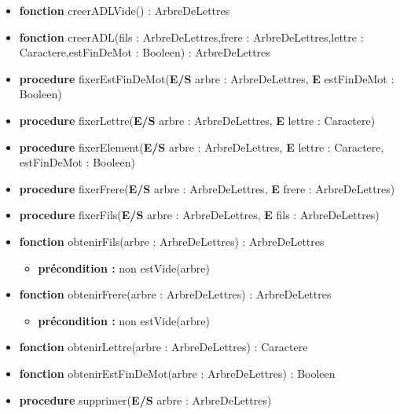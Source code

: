 \begin{itemize}[label=$\ $, leftmargin=1cm]
     \item \textbf{fonction} creerADLVide() : ArbreDeLettres
     \item \textbf{fonction} creerADL(fils : ArbreDeLettres,frere : ArbreDeLettres,lettre : Caractere,estFinDeMot : Booleen) : ArbreDeLettres
     \item \textbf{procedure} fixerEstFinDeMot(\textbf{E/S} arbre : ArbreDeLettres, \textbf{E} estFinDeMot : Booleen)
     \item \textbf{procedure} fixerLettre(\textbf{E/S} arbre : ArbreDeLettres, \textbf{E} lettre : Caractere)
     \item \textbf{procedure} fixerElement(\textbf{E/S} arbre : ArbreDeLettres, \textbf{E} lettre : Caractere, estFinDeMot : Booleen)
     \item \textbf{procedure} fixerFrere(\textbf{E/S} arbre : ArbreDeLettres, \textbf{E} frere : ArbreDeLettres)
     \item \textbf{procedure} fixerFils(\textbf{E/S} arbre : ArbreDeLettres, \textbf{E} fils : ArbreDeLettres)
     \item \textbf{fonction} obtenirFils(arbre : ArbreDeLettres) : ArbreDeLettres
     \begin{itemize}[label=$| $]
        \item \textbf{précondition : } non estVide(arbre)
     \end{itemize}
     \item \textbf{fonction} obtenirFrere(arbre : ArbreDeLettres) : ArbreDeLettres
     \begin{itemize}[label=$| $]
        \item \textbf{précondition : } non estVide(arbre)
     \end{itemize}
     \item \textbf{fonction} obtenirLettre(arbre : ArbreDeLettres) : Caractere
     \item \textbf{fonction} obtenirEstFinDeMot(arbre : ArbreDeLettres) : Booleen
     \item \textbf{procedure} supprimer(\textbf{E/S} arbre : ArbreDeLettres)

\end{itemize} 

